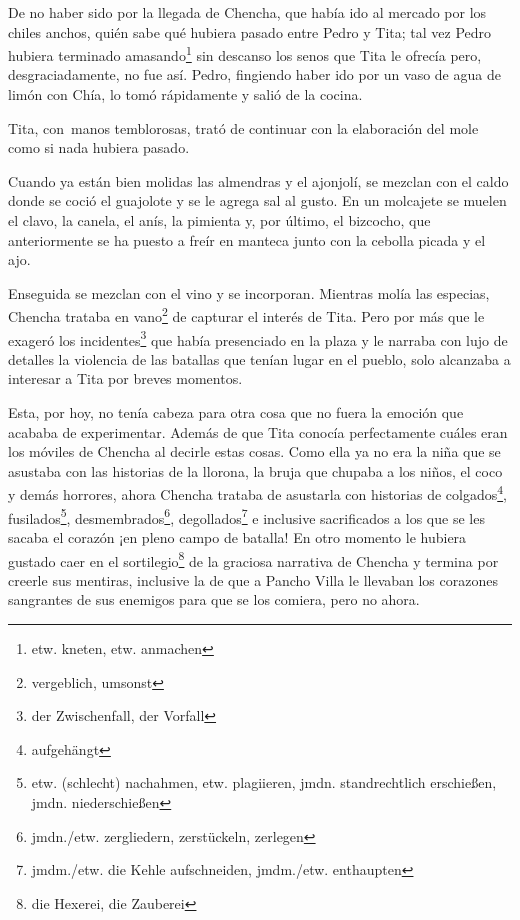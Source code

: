 De no haber sido por la llegada de Chencha, que había ido al mercado
por los chiles anchos, quién sabe qué hubiera pasado entre Pedro y Tita;
tal vez Pedro hubiera terminado amasando\footnote{etw. kneten, etw. anmachen}
sin descanso los senos que Tita le ofrecía pero, desgraciadamente, no
fue así. Pedro, fingiendo haber ido por un vaso de agua de limón con Chía,
lo tomó rápidamente y salió de la cocina.

Tita, con~manos temblorosas, trató de continuar con la elaboración
del mole como si nada hubiera pasado.

Cuando ya están bien molidas las almendras y el ajonjolí, se mezclan
con el caldo donde se coció el guajolote y se le agrega sal al gusto. En
un molcajete se muelen el clavo, la canela, el anís, la pimienta y, por
último, el bizcocho, que anteriormente se ha puesto a freír en manteca
junto con la cebolla picada y el ajo.

Enseguida se mezclan con el vino y se incorporan. Mientras molía las
especias, Chencha trataba en vano\footnote{vergeblich, umsonst} de
capturar el interés de Tita. Pero por más que le exageró los incidentes\footnote{der Zwischenfall, der Vorfall}
que había presenciado en la plaza y le narraba con lujo de detalles la
violencia de las batallas que tenían lugar en el pueblo, solo alcanzaba
a interesar a Tita por breves momentos.

Esta, por hoy, no tenía cabeza para otra cosa que no fuera la emoción
que acababa de experimentar. Además de que Tita conocía perfectamente
cuáles eran los móviles de Chencha al decirle estas cosas. Como ella ya
no era la niña que se asustaba con las historias de la llorona, la bruja
que chupaba a los niños, el coco y demás horrores, ahora Chencha trataba
de asustarla con historias de colgados\footnote{aufgehängt}, fusilados\footnote{etw. (schlecht) nachahmen, etw. plagiieren, jmdn. standrechtlich erschießen, jmdn. niederschießen}, desmembrados\footnote{jmdn./etw. zergliedern, zerstückeln, zerlegen}, degollados\footnote{jmdm./etw. die Kehle aufschneiden, jmdm./etw. enthaupten}
e inclusive sacrificados a los que se les sacaba el corazón
¡en pleno campo de batalla! En otro momento le hubiera gustado caer en
el sortilegio\footnote{die Hexerei, die Zauberei} de la graciosa
narrativa de Chencha y termina por creerle sus mentiras, inclusive la de que
a Pancho Villa le llevaban los corazones sangrantes de sus enemigos para que
se los comiera, pero no ahora.

